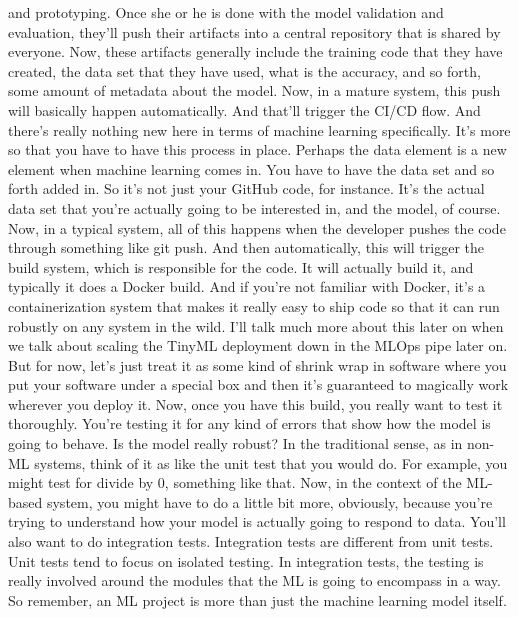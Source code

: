 {{{    and prototyping.
    Once she or he is done with the model validation and evaluation,
    they'll push their artifacts into a central repository
    that is shared by everyone.
    Now, these artifacts generally include the training code
    that they have created, the data set that they have used,
    what is the accuracy, and so forth, some amount of metadata about the model.
    Now, in a mature system, this push will basically happen automatically.
    And that'll trigger the CI/CD flow.
    And there's really nothing new here in terms of machine learning specifically.
    It's more so that you have to have this process in place.
    Perhaps the data element is a new element when machine learning comes in.
    You have to have the data set and so forth added in.
    So it's not just your GitHub code, for instance.
    It's the actual data set that you're actually going to be interested in,
    and the model, of course.
    Now, in a typical system, all of this happens
    when the developer pushes the code through something like git push.
    And then automatically, this will trigger the build system,
    which is responsible for the code.
    It will actually build it, and typically it does a Docker build.
    And if you're not familiar with Docker, it's
    a containerization system that makes it really easy to ship code so that it can
    run robustly on any system in the wild.
    I'll talk much more about this later on when
    we talk about scaling the TinyML deployment down in the MLOps pipe
    later on.
    But for now, let's just treat it as some kind of shrink wrap in software
    where you put your software under a special box
    and then it's guaranteed to magically work wherever you deploy it.
    Now, once you have this build, you really want to test it thoroughly.
    You're testing it for any kind of errors that
    show how the model is going to behave.
    Is the model really robust?
    In the traditional sense, as in non-ML systems,
    think of it as like the unit test that you would do.
    For example, you might test for divide by 0, something like that.
    Now, in the context of the ML-based system,
    you might have to do a little bit more, obviously,
    because you're trying to understand how your model is actually
    going to respond to data.
    You'll also want to do integration tests.
    Integration tests are different from unit tests.
    Unit tests tend to focus on isolated testing.
    In integration tests, the testing is really involved around the modules
    that the ML is going to encompass in a way.
    So remember, an ML project is more than just the machine learning model itself.
}}}
